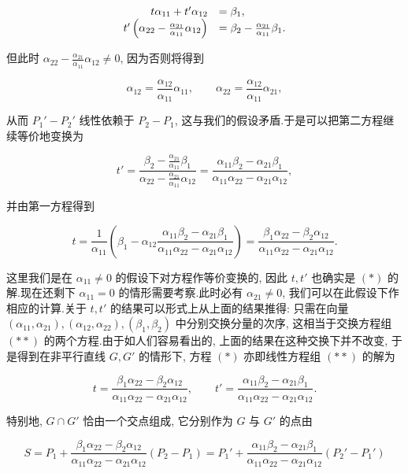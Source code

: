 \[
\begin{array}{r l}
t\alpha_{11} + t'\alpha_{12} &= \beta_1, \\
t'\left(\alpha_{22} - \frac{\alpha_{21}}{\alpha_{11}}\alpha_{12}\right) &= \beta_2 - \frac{\alpha_{21}}{\alpha_{11}}\beta_1\text{.}
\end{array}
\]

但此时 $\alpha_{22} - \frac{\alpha_{21}}{\alpha_{11}}\alpha_{12} \neq 0$, 因为否则将得到

\[
\alpha_{12} = \frac{\alpha_{12}}{\alpha_{11}}\alpha_{11}, \qquad
\alpha_{22} = \frac{\alpha_{12}}{\alpha_{11}}\alpha_{21},
\]

从而 $P_1' - P_2'$ 线性依赖于 $P_2 - P_1$, 这与我们的假设矛盾.于是可以把第二方程继续等价地变换为

\[
t' = \frac{\beta_2 - \frac{\alpha_{21}}{\alpha_{11}}\beta_1}{\alpha_{22} - \frac{\alpha_{21}}{\alpha_{11}}\alpha_{12}}
= \frac{\alpha_{11}\beta_2 - \alpha_{21}\beta_1}{\alpha_{11}\alpha_{22} - \alpha_{21}\alpha_{12}},
\]

并由第一方程得到

\[
t = \frac{1}{\alpha_{11}}\left(\beta_1 - \alpha_{12}\frac{\alpha_{11}\beta_2 - \alpha_{21}\beta_1}{\alpha_{11}\alpha_{22} - \alpha_{21}\alpha_{12}}\right)
= \frac{\beta_1\alpha_{22} - \beta_2\alpha_{12}}{\alpha_{11}\alpha_{22} - \alpha_{21}\alpha_{12}}\text{.}
\]

这里我们是在 $\alpha_{11} \neq 0$ 的假设下对方程作等价变换的, 因此 $t, t'$ 也确实是 $(*)$ 的解.现在还剩下 $\alpha_{11} = 0$ 的情形需要考察.此时必有 $\alpha_{21} \neq 0$, 我们可以在此假设下作相应的计算.关于 $t, t'$ 的结果可以形式上从上面的结果推得: 只需在向量 $(\alpha_{11}, \alpha_{21}), (\alpha_{12}, \alpha_{22}), (\beta_1, \beta_2)$ 中分别交换分量的次序, 这相当于交换方程组 $(**)$ 的两个方程.由于如人们容易看出的, 上面的结果在这种交换下并不改变, 于是得到在非平行直线 $G, G'$ 的情形下, 方程 $(*)$ 亦即线性方程组 $(**)$ 的解为

\[
t = \frac{\beta_1\alpha_{22} - \beta_2\alpha_{12}}{\alpha_{11}\alpha_{22} - \alpha_{21}\alpha_{12}}, \qquad
t' = \frac{\alpha_{11}\beta_2 - \alpha_{21}\beta_1}{\alpha_{11}\alpha_{22} - \alpha_{21}\alpha_{12}}\text{.}
\]

特别地, $G \cap G'$ 恰由一个交点组成, 它分别作为 $G$ 与 $G'$ 的点由

\[
S = P_1 + \frac{\beta_1\alpha_{22} - \beta_2\alpha_{12}}{\alpha_{11}\alpha_{22} - \alpha_{21}\alpha_{12}}(P_2 - P_1)
= P_1' + \frac{\alpha_{11}\beta_2 - \alpha_{21}\beta_1}{\alpha_{11}\alpha_{22} - \alpha_{21}\alpha_{12}}(P_2' - P_1')
\]

